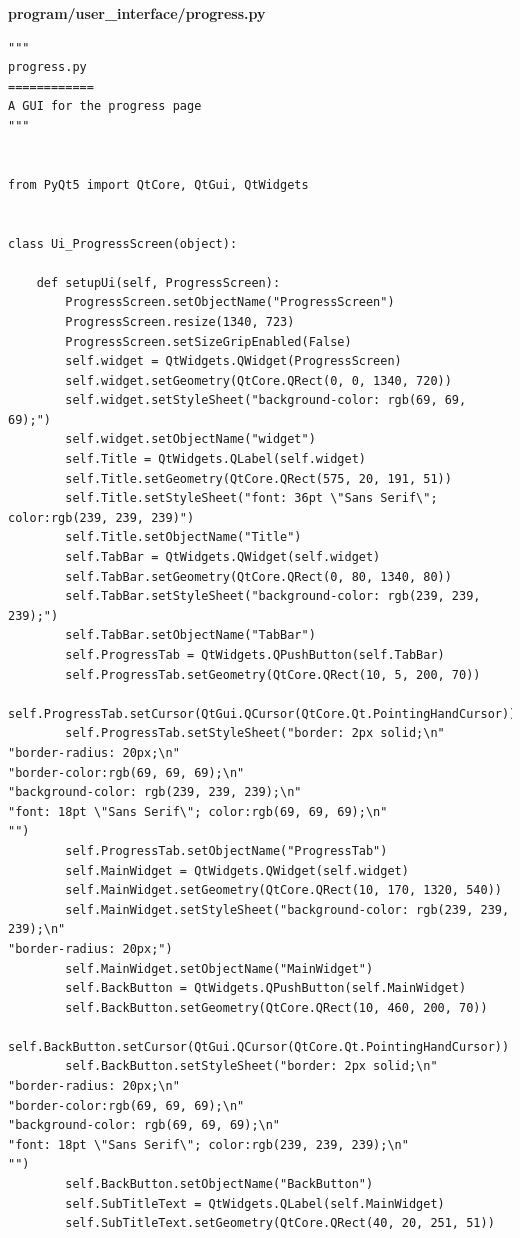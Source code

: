 \documentclass{article}
\begin{document}
\textbf{program/user\_interface/progress.py}
\begin{lstlisting}
"""
progress.py
============
A GUI for the progress page
"""


from PyQt5 import QtCore, QtGui, QtWidgets


class Ui_ProgressScreen(object):

    def setupUi(self, ProgressScreen):
        ProgressScreen.setObjectName("ProgressScreen")
        ProgressScreen.resize(1340, 723)
        ProgressScreen.setSizeGripEnabled(False)
        self.widget = QtWidgets.QWidget(ProgressScreen)
        self.widget.setGeometry(QtCore.QRect(0, 0, 1340, 720))
        self.widget.setStyleSheet("background-color: rgb(69, 69, 69);")
        self.widget.setObjectName("widget")
        self.Title = QtWidgets.QLabel(self.widget)
        self.Title.setGeometry(QtCore.QRect(575, 20, 191, 51))
        self.Title.setStyleSheet("font: 36pt \"Sans Serif\"; color:rgb(239, 239, 239)")
        self.Title.setObjectName("Title")
        self.TabBar = QtWidgets.QWidget(self.widget)
        self.TabBar.setGeometry(QtCore.QRect(0, 80, 1340, 80))
        self.TabBar.setStyleSheet("background-color: rgb(239, 239, 239);")
        self.TabBar.setObjectName("TabBar")
        self.ProgressTab = QtWidgets.QPushButton(self.TabBar)
        self.ProgressTab.setGeometry(QtCore.QRect(10, 5, 200, 70))
        self.ProgressTab.setCursor(QtGui.QCursor(QtCore.Qt.PointingHandCursor))
        self.ProgressTab.setStyleSheet("border: 2px solid;\n"
"border-radius: 20px;\n"
"border-color:rgb(69, 69, 69);\n"
"background-color: rgb(239, 239, 239);\n"
"font: 18pt \"Sans Serif\"; color:rgb(69, 69, 69);\n"
"")
        self.ProgressTab.setObjectName("ProgressTab")
        self.MainWidget = QtWidgets.QWidget(self.widget)
        self.MainWidget.setGeometry(QtCore.QRect(10, 170, 1320, 540))
        self.MainWidget.setStyleSheet("background-color: rgb(239, 239, 239);\n"
"border-radius: 20px;")
        self.MainWidget.setObjectName("MainWidget")
        self.BackButton = QtWidgets.QPushButton(self.MainWidget)
        self.BackButton.setGeometry(QtCore.QRect(10, 460, 200, 70))
        self.BackButton.setCursor(QtGui.QCursor(QtCore.Qt.PointingHandCursor))
        self.BackButton.setStyleSheet("border: 2px solid;\n"
"border-radius: 20px;\n"
"border-color:rgb(69, 69, 69);\n"
"background-color: rgb(69, 69, 69);\n"
"font: 18pt \"Sans Serif\"; color:rgb(239, 239, 239);\n"
"")
        self.BackButton.setObjectName("BackButton")
        self.SubTitleText = QtWidgets.QLabel(self.MainWidget)
        self.SubTitleText.setGeometry(QtCore.QRect(40, 20, 251, 51))

\end{lstlisting}
\end{document}
